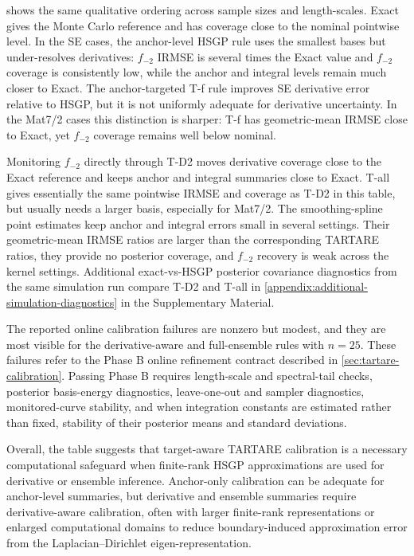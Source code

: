 \documentclass[11pt,a4paper]{article}
\theoremstyle{definition}
\theoremstyle{remark}
\begin{document}
 shows the same qualitative ordering across sample sizes and length-scales. Exact gives the Monte Carlo reference and has coverage close to the nominal pointwise level. In the SE cases, the anchor-level HSGP rule uses the smallest bases but under-resolves derivatives: \(f_{-2}\) IRMSE is several times the Exact value and \(f_{-2}\) coverage is consistently low, while the anchor and integral levels remain much closer to Exact. The anchor-targeted T-f rule improves SE derivative error relative to HSGP, but it is not uniformly adequate for derivative uncertainty. In the Mat7/2 cases this distinction is sharper: T-f has geometric-mean IRMSE close to Exact, yet \(f_{-2}\) coverage remains well below nominal.

Monitoring \(f_{-2}\) directly through T-D2 moves derivative coverage close to the Exact reference and keeps anchor and integral summaries close to Exact. T-all gives essentially the same pointwise IRMSE and coverage as T-D2 in this table, but usually needs a larger basis, especially for Mat7/2. The smoothing-spline point estimates keep anchor and integral errors small in several settings. Their geometric-mean IRMSE ratios are larger than the corresponding TARTARE ratios, they provide no posterior coverage, and \(f_{-2}\) recovery is weak across the kernel settings. Additional exact-vs-HSGP posterior covariance diagnostics from the same simulation run compare T-D2 and T-all in \cref{appendix:additional-simulation-diagnostics} in the Supplementary Material.

The reported online calibration failures are nonzero but modest, and they are most visible for the derivative-aware and full-ensemble rules with \(n=25\). These failures refer to the Phase B online refinement contract described in \cref{sec:tartare-calibration}. Passing Phase B requires length-scale and spectral-tail checks, posterior basis-energy diagnostics, leave-one-out and sampler diagnostics, monitored-curve stability, and when integration constants are estimated rather than fixed, stability of their posterior means and standard deviations.

Overall, the table suggests that target-aware TARTARE calibration is a necessary computational safeguard when finite-rank HSGP approximations are used for derivative or ensemble inference. Anchor-only calibration can be adequate for anchor-level summaries, but derivative and ensemble summaries require derivative-aware calibration, often with larger finite-rank representations or enlarged computational domains to reduce boundary-induced approximation error from the Laplacian--Dirichlet eigen-representation.
\end{document}
